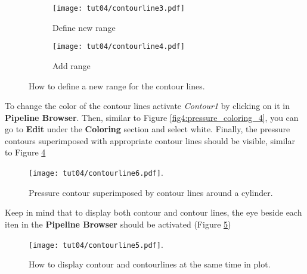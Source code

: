 \begin{figure}[htbp]
    \centering
    \begin{subfigure}[b]{.4\textwidth}
        \centering
        \texttt{[image: tut04/contourline3.pdf]}
        \caption{Define new range}
        \label{fig4:contourby_4 a}
    \end{subfigure}
    \hfill
    \begin{subfigure}[b]{.4\textwidth}
        \centering
        \texttt{[image: tut04/contourline4.pdf]}
        \caption{Add range}
        \label{fig4:contourby_4 b}
    \end{subfigure}     
    \caption{How to define a new range for the contour lines.}
    \label{fig4:contourby_4}
\end{figure}

To change the color of the contour lines activate \textit{Contour1} by clicking on it in \textbf{Pipeline Browser}. Then, similar to Figure \ref{fig4:pressure_coloring_4}, you can go to \textbf{Edit} under the \textbf{Coloring} section and select white. Finally, the pressure contours superimposed with appropriate contour lines should be visible, similar to Figure \ref{fig4:contourline6_4}
\begin{figure}[htbp]
    \centering
    \texttt{[image: tut04/contourline6.pdf]}.
    \caption{Pressure contour superimposed by contour lines around a cylinder.}
    \label{fig4:contourline6_4}
\end{figure}
Keep in mind that to display both contour and contour lines, the eye beside each iten in the \textbf{Pipeline Browser} should be activated (Figure \ref{fig4:contourline5_4})
\begin{figure}[htbp]
    \centering
    \texttt{[image: tut04/contourline5.pdf]}.
    \caption{How to display contour and contourlines at the same time in plot.}
    \label{fig4:contourline5_4}
\end{figure}

